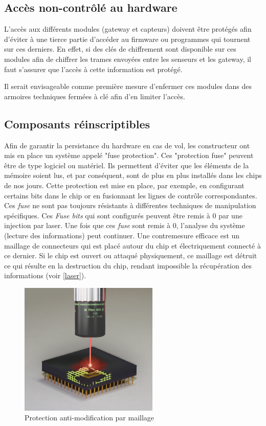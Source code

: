 \documentclass[12pt]{article}
\begin{document}
\subsection{Accès non-contrôlé au hardware}
\label{ssec:cm-acceshardware}

L'accès aux différents modules (gateway et capteurs) doivent être protégés afin d'éviter à une tierce partie d'accéder au firmware ou programmes qui tournent sur ces derniers. En effet, si des clés de chiffrement sont disponible sur ces modules afin de chiffrer les trames envoyées entre les senseurs et les gateway, il faut s'assurer que l'accès à cette information est protégé.

Il serait envisageable comme première mesure d'enfermer ces modules dans des armoires techniques fermées à clé afin d'en limiter l'accès.

\subsection{Composants réinscriptibles}
\label{ssec:cm-fuse}

Afin de garantir la persistance du hardware en cas de vol, les constructeur ont mis en place un système appelé "fuse protection". Ces "protection fuse" peuvent être de type logiciel ou matériel. Ils permettent d'éviter que les éléments de la mémoire soient lus, et par conséquent, sont de plus en plus installés dans les chips de nos jours. Cette protection est mise en place, par exemple, en configurant certains bits dans le chip or en fusionnant les lignes de contrôle correspondantes. Ces \textit{fuse} ne sont pas toujours résistants à différentes techniques de manipulation spécifiques. Ces \textit{Fuse bits} qui sont configurés peuvent être remis à 0 par une injection par laser. Une fois que ces \textit{fuse} sont remis à 0, l'analyse du système (lecture des informations) peut continuer. Une contremesure efficace est un maillage de connecteurs qui est placé autour du chip et électriquement connecté à ce dernier. Si le chip est ouvert ou attaqué physiquement, ce maillage est détruit ce qui résulte en la destruction du chip, rendant impossible la récupération des informations (voir \autoref{laser}).

\begin{figure}[!h]
	\centering
	\includegraphics[width=250px]{laserattack.png}
	\caption{Protection anti-modification par maillage}
	\label{laser}
\end{figure}
\end{document}
